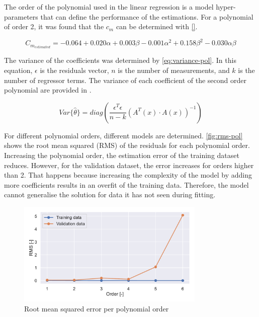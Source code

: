 The order of the polynomial used in the linear regression is a model hyper-parameters that can define the performance of the estimations. For a polynomial of order 2, it was found that the $c_m$ can be determined with  \autoref{}.

\begin{equation}
	C_{m_{estimated}} = -0.064 + 0.020 \alpha + 0.003 \beta -0.001 \alpha^2 +0.158 \beta^2 -0.030 \alpha \beta
\end{equation}

The variance of the coefficients was determined by \autoref{eq:variance-pol}. In this equation, $\epsilon$ is the residuals vector, $n$ is the number of measurements, and $k$ is the number of regressor terms. The variance of each coefficient of the second order polynomial are provided in .

\begin{equation}\label{eq:variance-pol}
	Var\{\hat{\theta}\} = diag(\frac{\epsilon^T\epsilon}{n-k}(A^T(x)\cdot A(x))^{-1})
\end{equation}

For different polynomial orders, different models are determined. \autoref{fig:rms-pol} shows the root mean squared (RMS) of the residuals for each polynomial order. Increasing the polynomial order, the estimation error of the training dataset reduces. However, for the validation dataset, the error increases for orders higher than 2. That happens because increasing the complexity of the model by adding more coefficients results in an overfit of the training data. Therefore, the model cannot generalise the solution for data it has not seen during fitting. 

\begin{figure}[h]
\centering
  \includegraphics[width=0.8\textwidth]{figures/parameter_estimation_mse}
  \caption{Root mean squared error per polynomial order}
  \label{fig:rms-pol}
\end{figure}

